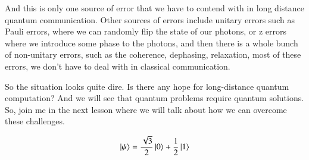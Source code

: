 And this is only one source of error that we have to contend with in long distance quantum communication. Other sources of errors include unitary errors such as Pauli errors, where we can randomly flip the state of our photons, or z errors where we introduce some phase to the photons, and then there is a whole bunch of non-unitary errors, such as the coherence, dephasing, relaxation, most of these errors, we don't have to deal with in classical communication.

So the situation looks quite dire. Is there any hope for long-distance quantum computation? And we will see that quantum problems require quantum solutions. So, join me in the next lesson where we will talk about how we can overcome these challenges.



\newpage
\begin{exercises}
\begin{equation*}
\ket{\psi} = \frac{\sqrt{3}}{2}\ket{0} + \frac{1}{2}\ket{1}
\end{equation*}


\end{exercises}

